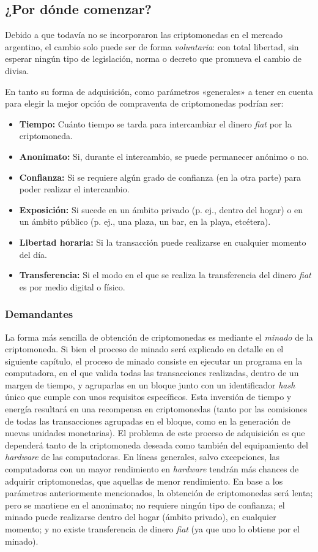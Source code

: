 \documentclass[12pt,a4paper,twoside]{book}
\begin{document}
\subsection{¿Por dónde comenzar?}
Debido a que todavía no se incorporaron las criptomonedas en el mercado argentino, el cambio solo puede ser de forma \textit{voluntaria}: con total libertad, sin esperar ningún tipo de legislación, norma o decreto que promueva el cambio de divisa.

En tanto su forma de adquisición, como parámetros «generales» a tener en cuenta para elegir la mejor opción de compraventa de criptomonedas podrían ser:

\begin{itemize}
\item \textbf{Tiempo:} Cuánto tiempo se tarda para intercambiar el dinero \textit{fiat} por la criptomoneda.
\item \textbf{Anonimato:} Si, durante el intercambio, se puede permanecer anónimo o no.
\item \textbf{Confianza:} Si se requiere algún grado de confianza (en la otra parte) para poder realizar el intercambio.
\item \textbf{Exposición:} Si sucede en un ámbito privado (p. ej., dentro del hogar) o en un ámbito público (p. ej., una plaza, un bar, en la playa, etcétera).
\item \textbf{Libertad horaria:} Si la transacción puede realizarse en cualquier momento del día.
\item \textbf{Transferencia:} Si el modo en el que se realiza la transferencia del dinero \textit{fiat} es por medio digital o físico.
\end{itemize}

\subsubsection{Demandantes}
La forma más sencilla de obtención de criptomonedas es mediante el \textit{minado} de la criptomoneda. Si bien el proceso de minado será explicado en detalle en el siguiente capítulo, el proceso de minado consiste en ejecutar un programa en la computadora, en el que valida todas las transacciones realizadas, dentro de un margen de tiempo, y agruparlas en un bloque junto con un identificador \textit{hash} único que cumple con unos requisitos específicos. Esta inversión de tiempo y energía  resultará en una recompensa en criptomonedas (tanto por las comisiones de todas las transacciones agrupadas en el bloque, como en la generación de nuevas unidades monetarias). El problema de este proceso de adquisición es que dependerá tanto de la criptomoneda deseada como también del equipamiento del \textit{hardware} de las computadoras. En líneas generales, salvo excepciones, las computadoras con un mayor rendimiento en \textit{hardware} tendrán más chances de adquirir criptomonedas, que aquellas de menor rendimiento. En base a los parámetros anteriormente mencionados, la obtención de criptomonedas será lenta; pero se mantiene en el anonimato; no requiere ningún tipo de confianza; el minado puede realizarse dentro del hogar (ámbito privado), en cualquier momento; y no existe transferencia de dinero \textit{fiat} (ya que uno lo obtiene por el minado).
\end{document}
